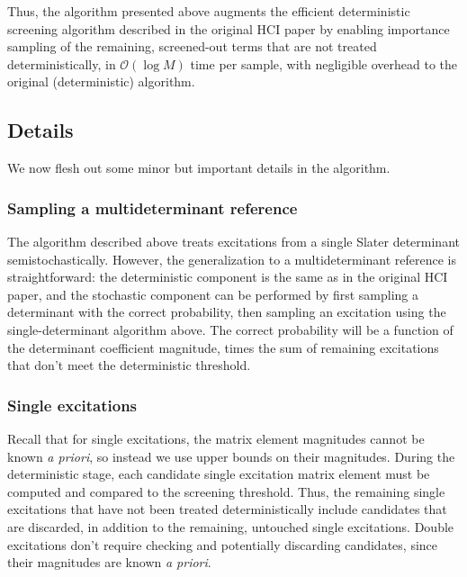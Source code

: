 \documentclass[english]{article}
\begin{document}
Thus, the algorithm presented above augments the efficient deterministic screening algorithm described in the original HCI paper by enabling importance sampling of the remaining, screened-out terms that are not treated deterministically, in $\mathcal{O}(\log M)$ time per sample, with negligible overhead to the original (deterministic) algorithm.

\subsection{Details}
We now flesh out some minor but important details in the algorithm.

\subsubsection{Sampling a multideterminant reference}
The algorithm described above treats excitations from a single Slater determinant semistochastically. However, the generalization to a multideterminant reference is straightforward: the deterministic component is the same as in the original HCI paper, and the stochastic component can be performed by first sampling a determinant with the correct probability, then sampling an excitation using the single-determinant algorithm above. The correct probability will be a function of the determinant coefficient magnitude, times the sum of remaining excitations that don't meet the deterministic threshold.

\subsubsection{Single excitations}
Recall that for single excitations, the matrix element magnitudes cannot be known \emph{a priori}, so instead we use upper bounds on their magnitudes. During the deterministic stage, each candidate single excitation matrix element must be computed and compared to the screening threshold. Thus, the remaining single excitations that have not been treated deterministically include candidates that are discarded, in addition to the remaining, untouched single excitations. Double excitations don't require checking and potentially discarding candidates, since their magnitudes are known \emph{a priori}.
\end{document}
